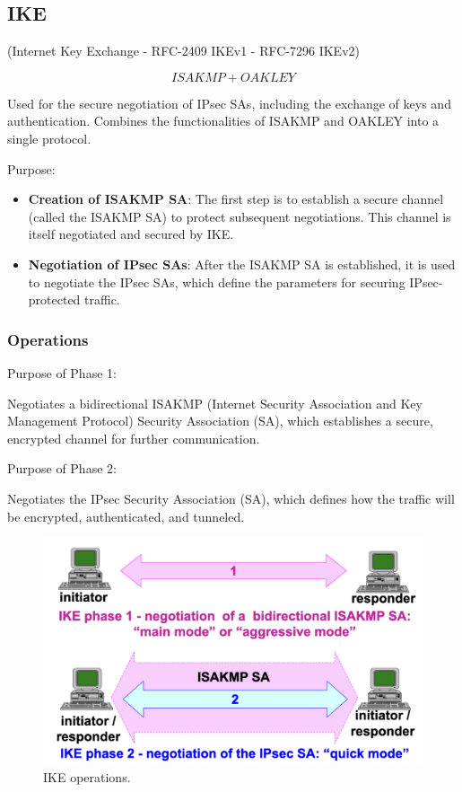 \subsection{IKE}
\begin{center}
    (Internet Key Exchange - RFC-2409 IKEv1 - RFC-7296 IKEv2)
\end{center}
\[
ISAKMP + OAKLEY
\]

Used for the secure negotiation of IPsec SAs, including the exchange of keys and authentication. Combines the functionalities of ISAKMP and OAKLEY into a single protocol.

Purpose:
\begin{itemize}
\item \textbf{Creation of ISAKMP SA}: The first step is to establish a secure channel (called the ISAKMP SA) to protect subsequent negotiations. This channel is itself negotiated and secured by IKE.
\item \textbf{Negotiation of IPsec SAs}: After the ISAKMP SA is established, it is used to negotiate the IPsec SAs, which define the parameters for securing IPsec-protected traffic.
\end{itemize}

\subsubsection{Operations}
Purpose of Phase 1:

\begin{center}
    Negotiates a bidirectional ISAKMP (Internet Security Association and Key Management Protocol) Security Association (SA), which establishes a secure, encrypted channel for further communication.
\end{center}
Purpose of Phase 2:
\begin{center}
    Negotiates the IPsec Security Association (SA), which defines how the traffic will be encrypted, authenticated, and tunneled.
\end{center}

\begin{figure}[H]
  \includegraphics[width=\linewidth]{Images/NetSec/ike_operations.png}
  \caption{IKE operations.}
\end{figure}


